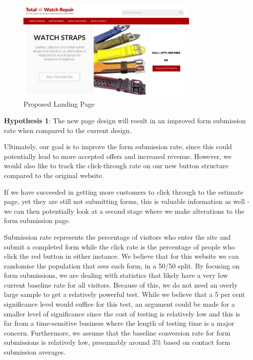 \documentclass[12pt, authoryear]{elsarticle}
\begin{document}
\begin{figure}[H]
	\centering
	\includegraphics[clip, angle=0, width=0.8\textwidth]{New_Landing_Page.jpg}
	\caption{Proposed Landing Page}\label{NewLandingPage_Shop}
\end{figure}

\textbf{Hypothesis 1}: The new page design will result in an improved form submission rate when compared to the current design.

Ultimately, our goal is to improve the form submission rate, since this could potentially lead to more accepted offers and increased revenue. However, we would also like to track the click-through rate on our new button structure compared to the original website.

If we have succeeded in getting more customers to click through to the estimate page, yet they are still not submitting forms, this is valuable information as well - we can then potentially look at a second stage where we make alterations to the form submission page.

Submission rate represents the percentage of visitors who enter the site and submit a completed form while the click rate is the percentage of people who click the red button in either instance. We believe that for this website we can randomise the population that sees each form, in a 50/50 split. By focusing on form submissions, we are dealing with statistics that likely have a very low current baseline rate for all visitors.  Because of this, we do not need an overly large sample to get a relatively powerful test. While we believe that a 5 per cent significance level would suffice for this test, an argument could be made for a smaller level of significance since the cost of testing is relatively low and this is far from a time-sensitive business where the length of testing time is a major concern. Furthermore, we assume that the baseline conversion rate for form submissions is relatively low, presumably around 3\% based on contact form submission averages. 
\end{document}
